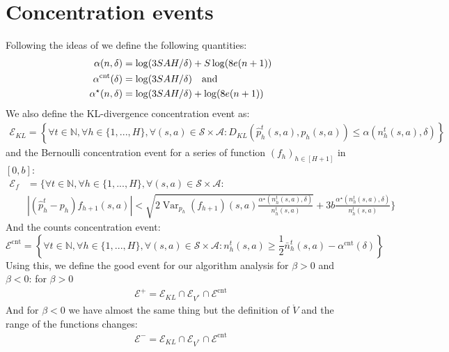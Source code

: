 \documentclass[final,12pt]{colt2026} %
\begin{document}
\section{Concentration events}\label{Concentration_events}
Following the ideas of \citep{Menard2021Fast} we define the following quantities:
\begin{align}
\alpha(n, \delta) &= \log(3SAH/\delta) + S \log(8e(n + 1)) \label{eq:bonuses}\notag\\
\alpha^{\text{cnt}}(\delta) &= \log(3SAH/\delta) \quad \text{and} \notag\\
\alpha^\star(n, \delta) &= \log(3SAH/\delta) + \log(8e(n + 1))
\end{align}
We also define the KL-divergence concentration event as: 
\begin{align*}
    \mathcal{E}_{KL} = \left\{ \forall t \in \mathbb{N}, \forall h \in \{1,...,H\}, \forall (s, a) \in \mathcal{S} \times \mathcal{A} : D_{KL}(\widehat{p}_h^t(s,a), p_h(s,a)) \leq \alpha(n_h^t(s,a),\delta) \right\}
\end{align*}
and the Bernoulli concentration event for a series of function $(f_h)_{h \in [H+1]}$ in $[0,b]$:
\begin{align*}
    \mathcal{E}_{f} &= \Bigg\{ \forall t \in \mathbb{N}, \forall h \in \{1,...,H\}, \forall (s, a) \in \mathcal{S} \times \mathcal{A} : \\&\left| (\widehat{p}_h^t - p_h) f_{h+1}(s, a) \right| < \sqrt{ 2 \operatorname{Var}_{p_h}(f_{h+1})(s, a) \frac{\alpha^\star(n_h^t(s, a), \delta)}{n_h^t(s, a)} }+ 3 b \frac{\alpha^\star(n_h^t(s, a), \delta)}{n_h^t(s, a)} \Bigg\}
\end{align*}
And the counts concentration event:
$$\mathcal{E}^{\text{cnt}} = \left\{ \forall t \in \mathbb{N}, \forall h \in \{1,...,H\}, \forall (s, a) \in \mathcal{S} \times \mathcal{A} : n_h^t(s, a) \geq \frac{1}{2} \bar{n}_h^t(s, a) - \alpha^{\text{cnt}}(\delta) \right\}$$
Using this, we define the good event for our algorithm analysis for $\beta > 0$ and $\beta <0$: for $\beta >0$
\begin{align*}
    \mathcal{E}^+ = \mathcal{E}_{KL} \cap  \mathcal{E}_{V^*} \cap \mathcal{E}^{\text{cnt}}
\end{align*}
And for $\beta <0$ we have almost the same thing but the definition of $\mathring{V}$ and the range of the functions changes:
\begin{align*}
    \mathcal{E}^- = \mathcal{E}_{KL} \cap  \mathcal{E}_{V^*} \cap \mathcal{E}^{\text{cnt}}
\end{align*}
\end{document}
